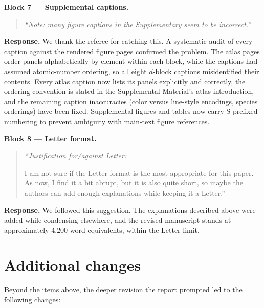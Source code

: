 \documentclass[11pt]{article}
\newenvironment{refquote}%
  {\begin{quote}\itshape\color{black!70}}%
  {\end{quote}}
\begin{document}
\textbf{Block 7 --- Supplemental captions.}

\begin{refquote}
``Note: many figure captions in the Supplementary seem to be
incorrect.''
\end{refquote}

\textbf{Response.}  We thank the referee for catching this.  A
systematic audit of every caption against the rendered figure pages
confirmed the problem.  The atlas pages order panels alphabetically by
element within each block, while the captions had assumed
atomic-number ordering, so all eight $d$-block captions misidentified
their contents.  Every atlas caption now lists its panels explicitly
and correctly, the ordering convention is stated in the Supplemental
Material's atlas introduction, and the remaining caption inaccuracies
(color versus line-style encodings, species orderings) have been
fixed.  Supplemental figures and tables now carry S-prefixed
numbering to prevent ambiguity with main-text figure references.

\textbf{Block 8 --- Letter format.}

\begin{refquote}
``Justification for/against Letter:

I am not sure if the Letter format is the most appropriate for this
paper.  As now, I find it a bit abrupt, but it is also quite short, so
maybe the authors can add enough explanations while keeping it a
Letter.''
\end{refquote}

\textbf{Response.}  We followed this suggestion.  The explanations
described above were added while condensing elsewhere, and the
revised manuscript stands at approximately 4{,}200 word-equivalents,
within the Letter limit.

\section*{Additional changes}

Beyond the items above, the deeper revision the report prompted led to
the following changes:
\end{document}
